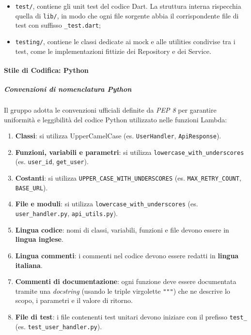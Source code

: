\documentclass[a4paper,12pt]{article}
\begin{document}
\begin{itemize}
\begin{itemize}
\begin{itemize}
            \item \texttt{services/}, contiene le classi Service, che comunicano con sorgenti dati esterne (API REST, database locali, ecc.).
        \end{itemize}
        \item \texttt{utils/}, contiene classi e funzioni di utilità condivise tra più componenti del progetto, come ad esempio helper per la gestione degli errori, formattazione delle date, ecc.
    \end{itemize}
    \item \texttt{test/}, contiene gli unit test del codice Dart. La struttura interna rispecchia quella di \texttt{lib/}, in modo che ogni file sorgente abbia il corrispondente file di test con suffisso \texttt{\_test.dart};
    \item \texttt{testing/}, contiene le classi dedicate ai mock e alle utilities condivise tra i test, come le implementazioni fittizie dei Repository e dei Service.
\end{itemize}

\paragraph{Stile di Codifica: Python} \label{par:stile-cod-py}

\subparagraph{Convenzioni di nomenclatura Python}
Il gruppo adotta le convenzioni ufficiali definite da \textit{PEP 8} per garantire uniformità e leggibilità del codice Python utilizzato nelle funzioni Lambda:
\begin{enumerate}
    \item \textbf{Classi}: si utilizza UpperCamelCase (es. \texttt{UserHandler}, \texttt{ApiResponse}).
    \item \textbf{Funzioni, variabili e parametri}: si utilizza \texttt{lowercase\_with\_underscores} (es. \texttt{user\_id}, \texttt{get\_user}).
    \item \textbf{Costanti}: si utilizza \texttt{UPPER\_CASE\_WITH\_UNDERSCORES} (es. \texttt{MAX\_RETRY\_COUNT}, \texttt{BASE\_URL}).
    \item \textbf{File e moduli}: si utilizza \texttt{lowercase\_with\_underscores} (es. \texttt{user\_handler.py}, \texttt{api\_utils.py}).
    \item \textbf{Lingua codice}: nomi di classi, variabili, funzioni e file devono essere in \textbf{lingua inglese}.
    \item \textbf{Lingua commenti}: i commenti nel codice devono essere redatti in \textbf{lingua italiana}.
    \item \textbf{Commenti di documentazione}: ogni funzione deve essere documentata tramite una \textit{docstring} (usando le triple virgolette \texttt{"""}) che ne descrive lo scopo, i parametri e il valore di ritorno.
    \item \textbf{File di test}: i file contenenti test unitari devono iniziare con il prefisso \texttt{test\_} (es. \texttt{test\_user\_handler.py}).
\end{enumerate}
\end{document}
